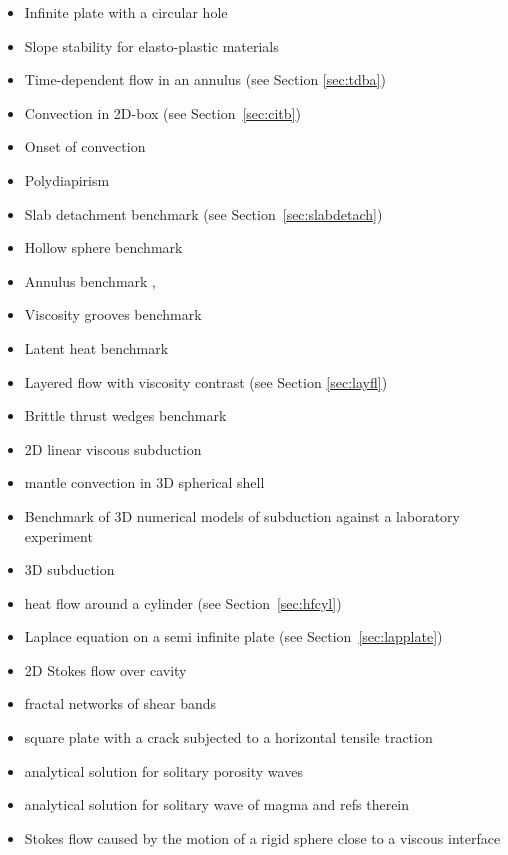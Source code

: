 \begin{itemize}
\item Infinite plate with a circular hole \cite{rama16}
\item Slope stability for elasto-plastic materials \cite{rama16}
\item Time-dependent flow in an annulus \cite{galb19} (see Section \ref{sec:tdba})
\item Convection in 2D-box \cite{galb19} (see Section~\ref{sec:citb})
\item Onset of convection \cite{aspectmanual}
\item Polydiapirism \cite{wesc92,aspectmanual}
\item Slab detachment benchmark (see Section~\ref{sec:slabdetach}) 
\item Hollow sphere benchmark \cite{thie17}
\item Annulus benchmark \cite{aspectmanual}, \cite{ples11}
\item Viscosity grooves benchmark \cite{aspectmanual}
\item Latent heat benchmark \cite{aspectmanual}
\item Layered flow with viscosity contrast \cite{aspectmanual} (see Section \ref{sec:layfl}) 
\item Brittle thrust wedges benchmark \cite{busa16,aspectmanual}
\item 2D linear viscous subduction \cite{scbe08,gltf18}
\item mantle convection in 3D spherical shell \cite{rasz96,zhzm00,yoka04,chcc07,zhmt08,kaks08,dadb13,arfw14,liki19}
\item Benchmark of 3D numerical models of subduction against a laboratory experiment \cite{memm18}
\item 3D subduction \cite{ozrs08}
\item heat flow around a cylinder (see Section~\ref{sec:hfcyl})
\item Laplace equation on a semi infinite plate (see Section~\ref{sec:lapplate})
\item 2D Stokes flow over cavity \cite{poma14}
\item fractal networks of  shear bands \cite{pohe94}
\item square plate with a crack subjected to a horizontal tensile traction \cite{litu02}
\item analytical solution for solitary porosity waves \cite{copo15}
\item analytical solution for solitary wave of magma \cite{dahe16} and refs therein
\item Stokes flow caused by the motion of a rigid sphere close to a viscous interface \cite{dagr98}
\end{itemize}

